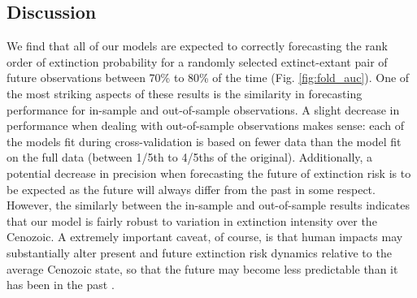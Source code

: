 \documentclass[12pt,letterpaper]{article}
\begin{document}
\begin{refsection}
%
%
%



\section{Discussion}

We find that all of our models are expected to correctly forecasting the rank order of extinction probability for a randomly selected extinct-extant pair of future observations between 70\% to 80\% of the time (Fig. \ref{fig:fold_auc}). One of the most striking aspects of these results is the similarity in forecasting performance for in-sample and out-of-sample observations. A slight decrease in performance when dealing with out-of-sample observations makes sense: each of the models fit during cross-validation is based on fewer data than the model fit on the full data (between 1/5th to 4/5ths of the original). Additionally, a potential decrease in precision when forecasting the future of extinction risk is to be expected as the future will always differ from the past in some respect. However, the similarly between the in-sample and out-of-sample results indicates that our model is fairly robust to variation in extinction intensity over the Cenozoic. A extremely important caveat, of course, is that human impacts may substantially alter present and future extinction risk dynamics relative to the average Cenozoic state, so that the future may become less predictable than it has been in the past \citep{Harnik2012a,Finnegan2015}.


\end{refsection}
\end{document}
